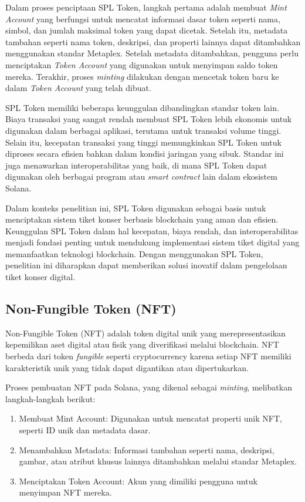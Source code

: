 Dalam proses penciptaan SPL Token, langkah pertama adalah membuat \textit{Mint Account} yang berfungsi untuk mencatat informasi dasar token seperti nama, simbol, dan jumlah maksimal token yang dapat dicetak. Setelah itu, metadata tambahan seperti nama token, deskripsi, dan properti lainnya dapat ditambahkan menggunakan standar Metaplex. Setelah metadata ditambahkan, pengguna perlu menciptakan \textit{Token Account} yang digunakan untuk menyimpan saldo token mereka. Terakhir, proses \textit{minting} dilakukan dengan mencetak token baru ke dalam \textit{Token Account} yang telah dibuat.

SPL Token memiliki beberapa keunggulan dibandingkan standar token lain. Biaya transaksi yang sangat rendah membuat SPL Token lebih ekonomis untuk digunakan dalam berbagai aplikasi, terutama untuk transaksi volume tinggi. Selain itu, kecepatan transaksi yang tinggi memungkinkan SPL Token untuk diproses secara efisien bahkan dalam kondisi jaringan yang sibuk. Standar ini juga menawarkan interoperabilitas yang baik, di mana SPL Token dapat digunakan oleh berbagai program atau \textit{smart contract} lain dalam ekosistem Solana.

Dalam konteks penelitian ini, SPL Token digunakan sebagai basis untuk menciptakan sistem tiket konser berbasis blockchain yang aman dan efisien. Keunggulan SPL Token dalam hal kecepatan, biaya rendah, dan interoperabilitas menjadi fondasi penting untuk mendukung implementasi sistem tiket digital yang memanfaatkan teknologi blockchain. Dengan menggunakan SPL Token, penelitian ini diharapkan dapat memberikan solusi inovatif dalam pengelolaan tiket konser digital.


\subsection{Non-Fungible Token (NFT)}

Non-Fungible Token (NFT) adalah token digital unik yang merepresentasikan kepemilikan aset digital atau fisik yang diverifikasi melalui blockchain. NFT berbeda dari token \textit{fungible} seperti cryptocurrency karena setiap NFT memiliki karakteristik unik yang tidak dapat digantikan atau dipertukarkan.

Proses pembuatan NFT pada Solana, yang dikenal sebagai \textit{minting}, melibatkan langkah-langkah berikut:
\begin{enumerate}
    \item {Membuat Mint Account}: Digunakan untuk mencatat properti unik NFT, seperti ID unik dan metadata dasar.
    \item {Menambahkan Metadata}: Informasi tambahan seperti nama, deskripsi, gambar, atau atribut khusus lainnya ditambahkan melalui standar Metaplex.
    \item {Menciptakan Token Account}: Akun yang dimiliki pengguna untuk menyimpan NFT mereka.
\end{enumerate}

